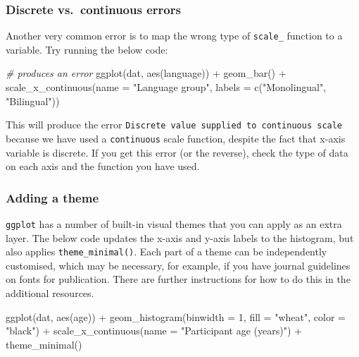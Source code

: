 \documentclass[
  english,
  doc,floatsintext]{apa6}
\newenvironment{Shaded}{\begin{snugshade}}{\end{snugshade}}
\newcommand{\AttributeTok}[1]{\textcolor[rgb]{0.77,0.63,0.00}{#1}}
\newcommand{\CommentTok}[1]{\textcolor[rgb]{0.56,0.35,0.01}{\textit{#1}}}
\newcommand{\DecValTok}[1]{\textcolor[rgb]{0.00,0.00,0.81}{#1}}
\newcommand{\FunctionTok}[1]{\textcolor[rgb]{0.00,0.00,0.00}{#1}}
\newcommand{\NormalTok}[1]{#1}
\newcommand{\SpecialCharTok}[1]{\textcolor[rgb]{0.00,0.00,0.00}{#1}}
\newcommand{\StringTok}[1]{\textcolor[rgb]{0.31,0.60,0.02}{#1}}
\begin{document}
\hypertarget{discrete-vs.-continuous-errors}{%
\subsubsection{Discrete vs.~continuous errors}\label{discrete-vs.-continuous-errors}}

Another very common error is to map the wrong type of \texttt{scale\_} function to a variable. Try running the below code:

\begin{Shaded}
\begin{Highlighting}[]
\CommentTok{\# produces an error}
\FunctionTok{ggplot}\NormalTok{(dat, }\FunctionTok{aes}\NormalTok{(language)) }\SpecialCharTok{+}
  \FunctionTok{geom\_bar}\NormalTok{() }\SpecialCharTok{+}
  \FunctionTok{scale\_x\_continuous}\NormalTok{(}\AttributeTok{name =} \StringTok{"Language group"}\NormalTok{, }
                   \AttributeTok{labels =} \FunctionTok{c}\NormalTok{(}\StringTok{"Monolingual"}\NormalTok{, }\StringTok{"Bilingual"}\NormalTok{)) }
\end{Highlighting}
\end{Shaded}

This will produce the error \texttt{Discrete\ value\ supplied\ to\ continuous\ scale} because we have used a \texttt{continuous} scale function, despite the fact that x-axis variable is discrete. If you get this error (or the reverse), check the type of data on each axis and the function you have used.

\hypertarget{adding-a-theme}{%
\subsubsection{Adding a theme}\label{adding-a-theme}}

\texttt{ggplot} has a number of built-in visual themes that you can apply as an extra layer. The below code updates the x-axis and y-axis labels to the histogram, but also applies \texttt{theme\_minimal()}. Each part of a theme can be independently customised, which may be necessary, for example, if you have journal guidelines on fonts for publication. There are further instructions for how to do this in the additional resources.

\begin{Shaded}
\begin{Highlighting}[]
\FunctionTok{ggplot}\NormalTok{(dat, }\FunctionTok{aes}\NormalTok{(age)) }\SpecialCharTok{+}
  \FunctionTok{geom\_histogram}\NormalTok{(}\AttributeTok{binwidth =} \DecValTok{1}\NormalTok{, }\AttributeTok{fill =} \StringTok{"wheat"}\NormalTok{, }\AttributeTok{color =} \StringTok{"black"}\NormalTok{) }\SpecialCharTok{+}
  \FunctionTok{scale\_x\_continuous}\NormalTok{(}\AttributeTok{name =} \StringTok{"Participant age (years)"}\NormalTok{) }\SpecialCharTok{+}
  \FunctionTok{theme\_minimal}\NormalTok{()}
\end{Highlighting}
\end{Shaded}
\end{document}
